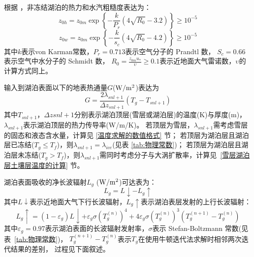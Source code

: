 根据 \citet{Zilitinkevich2001}，非冻结湖泊的热力和水汽粗糙度表达为：
\begin{equation}
z_{0 h}=z_{0 m} \exp \left\{-\frac{k}{P_{r}}\left(4 \sqrt{R_{0}}-3.2\right)\right\} \geq 10^{-5}
\end{equation}
\begin{equation}
z_{0 w}=z_{0 m} \exp \left\{-\frac{k}{s_{c}}\left(4 \sqrt{R_{0}}-4.2\right)\right\} \geq 10^{-5}
\end{equation}
其中$k$表示von Karman常数，$P_r=0.713$表示空气分子的 Prandtl 数，
$S_c=0.66$表示空气中水分子的 Schmidt 数，
$R_0=\frac{z_{0m}u_\ast}{\upsilon}\geq0.1$表示近地面大气雷诺数，$\upsilon$的计算方式同上。


输入到湖泊表面以下的地表热通量$G$($\rm W/m^2$)表达为
\begin{equation}
G=\frac{2 \lambda_{s n l+1}}{\Delta z_{s n l+1}}\left(T_{g}-T_{s n l+1}\right)
\end{equation}
其中$T_{snl+1}$，$\Delta zsnl+1$分别表示湖泊顶层(雪层或湖泊层)的温度(K)与厚度(m)，
$\lambda_{snl+1}$表示湖泊顶层的热力传导率(W/m/K)。
若顶层为雪层，$\lambda_{snl+1}$需考虑雪层的固态和液态含水量，计算见 \ref{温度求解的数值格式} 节；
若顶层为湖泊层且湖泊层已冻结($T_g\le T_f$)，则$\lambda_{snl+1}=\lambda_{ice}$(见表 \ref{tab:物理常数})；
若顶层为湖泊层且湖泊层未冻结($T_g>T_f$)，则$\lambda_{snl+1}$需同时考虑分子与大涡扩散率，计算见~\ref{雪层湖泊层土壤层温度的计算} 节。


湖泊表面吸收的净长波辐射$L_g$ ($\rm W/m^2$)可达表为：
\begin{equation}
L_{g}=L \downarrow-L_{g} \uparrow
\end{equation}
其中$L\downarrow$表示近地面大气下行长波辐射，$L_g\uparrow$表示湖泊表层发射的上行长波辐射：
\begin{equation}
L_{g} \uparrow=\left(1-\varepsilon_{g}\right) L \downarrow+\varepsilon_{g} 
\sigma\left(T_{g}^{(n)}\right)^{4}+4 \varepsilon_{g} 
\sigma\left(T_{g}^{(n)}\right)^{3}\left(T_{g}^{(n+1)}-T_{g}^{(n)}\right)
\end{equation}
其中$\varepsilon_g=0.97$表示湖泊表面的长波辐射发射率，$\sigma$表示 Stefan-Boltzmann 常数(见表~\ref{tab:物理常数})，
$T_g^{\left(n+1\right)}-T_g^{\left(n\right)}$表示$T_g$在使用牛顿迭代法求解时相邻两次迭代结果的差别，
过程见下面叙述。


